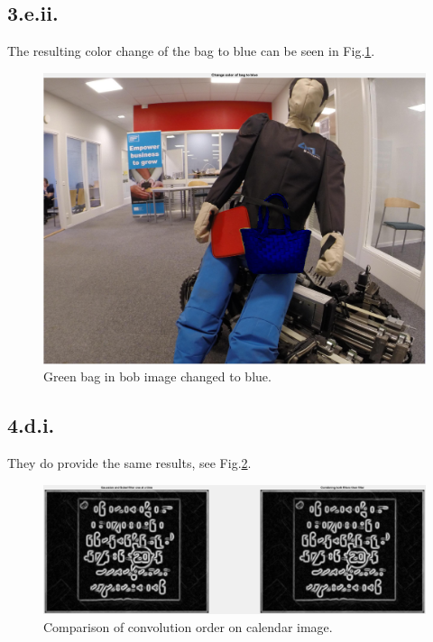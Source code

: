 \subsection{3.e.ii.}
The resulting color change of the bag to blue can be seen in Fig.\:\ref{fig:blue_bag}.
\begin{figure}
    \centering
    \includegraphics[width=\columnwidth]{images/blue_bag.png}
    \caption{Green bag in bob image changed to blue.}
    \label{fig:blue_bag}
\end{figure}


\subsection{4.d.i.}
They do provide the same results, see Fig.\:\ref{fig:associative}.
\begin{figure}
    \centering
    \includegraphics[width=\columnwidth]{images/associative.png}
    \caption{Comparison of convolution order on calendar image.}
    \label{fig:associative}
\end{figure}


